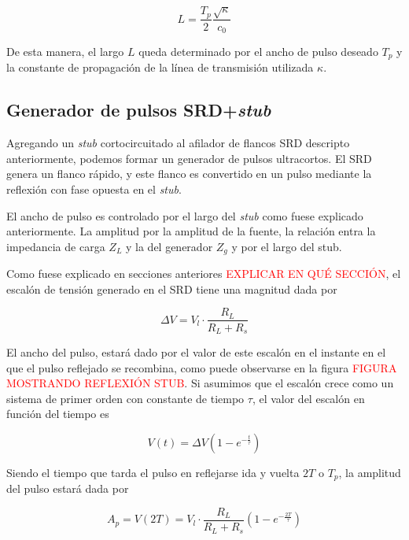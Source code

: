 \begin{equation}
  L = \frac{T_p}{2}\frac{\sqrt{\kappa}}{c_0}
\end{equation}

De esta manera, el largo $L$ queda determinado por el ancho de pulso deseado
$T_p$ y la constante de propagación de la línea de transmisión utilizada
$\kappa$.

\subsection{Generador de pulsos SRD+\textit{stub}}

Agregando un \textit{stub} cortocircuitado al afilador de flancos SRD
descripto anteriormente, podemos formar un generador de pulsos ultracortos. El
SRD genera un flanco rápido, y este flanco es convertido en un pulso
mediante la reflexión con fase opuesta en el \textit{stub}. 

El ancho de pulso es controlado por el largo del \textit{stub} como fuese
explicado anteriormente. La amplitud por la amplitud de la fuente, la relación
entra la impedancia de carga $Z_L$ y la del generador $Z_g$ y por el largo del
stub.

Como fuese explicado en secciones anteriores \textcolor{red}{EXPLICAR EN QUÉ
SECCIÓN}, el escalón de tensión generado en el SRD tiene una magnitud dada por

\begin{equation}
    \Delta V = V_l \cdot \frac{R_L}{R_L+R_s}
\end{equation}

El ancho del pulso, estará dado por el valor de este escalón en el instante en
el que el pulso reflejado se recombina, como puede observarse en la figura
\textcolor{red}{FIGURA MOSTRANDO REFLEXIÓN STUB}. Si asumimos que el escalón
crece como un sistema de primer orden con constante de tiempo $\tau$, el valor
del escalón en función del tiempo es

\begin{equation}
  V(t) = \Delta V \left( 1-e^{-\frac{t}{\tau}}\right)
\end{equation}

Siendo el tiempo que tarda el pulso en reflejarse ida y vuelta $2T$ o $T_p$, la
amplitud del pulso estará dada por

\begin{equation}
    \label{eq:A_p}
    A_p = V(2T) = V_l \cdot \frac{R_L}{R_L+R_s} \left( 1-e^{-\frac{2T}{\tau}}\right)
\end{equation}


